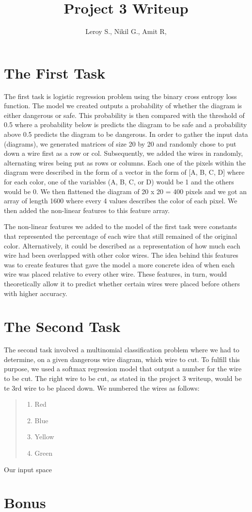 \documentclass{article}
\title{Project 3 Writeup}
\author{Leroy S., Nikil G., Amit R,}
\begin{document}
\maketitle

\section*{The First Task}
    The first task is logistic regression problem using the binary cross entropy loss function. The model we created outputs a probability of whether the diagram is either dangerous or safe. 
    This probability is then compared with the threshold of 0.5 where a probability below is predicts the diagram to be safe and a probability above 0.5 predicts the diagram to be dangerous.
    In order to gather the input data (diagrams), we generated matrices of size 20 by 20 and randomly chose to put down a wire first as a row or col. Subsequently, we added the wires in randomly, 
    alternating wires being put as rows or columns. Each one of the pixels within the diagram were described in the form of a vector in the form of [A, B, C, D] where for each color, one of the variables (A, B, C, or D) 
    would be 1 and the others would be 0. We then flattened the diagram of 20 x 20 = 400 pixels and we got an array of length 1600 where every 4 values describes the color of each pixel. We then added the non-linear features
    to this feature array. \newline

    The non-linear features we added to the model of the first task were constants that represented the percentage of each wire that still remained of the original color. Alternatively, it could be described as a representation 
    of how much each wire had been overlapped with other color wires. The idea behind this features was to create features that gave the model a more concrete idea of when each wire was placed relative to every other wire. 
    These features, in turn, would theoretically allow it to predict whether certain wires were placed before others with higher accuracy. 
\section*{The Second Task}
The second task involved a multinomial classification problem where we had to determine, on a given dangerous wire diagram, which wire to cut.
To fulfill this purpose, we used a softmax regression model that output a number for the wire to be cut. The right wire to be cut, as stated in the project 3 writeup, would be te 3rd wire to be placed down.\newline
\newline
We numbered the wires as follows:
\begin{quote}
    \begin{enumerate}
    \item Red
    \item Blue
    \item Yellow
    \item Green
    \end{enumerate}
    \end{quote}

Our input space 

\section*{Bonus}
\end{document}

